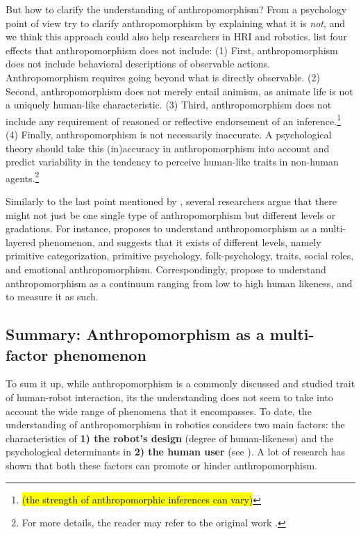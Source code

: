 \documentclass{frontiersSCNS} %
\begin{document}
But how to clarify the understanding of anthropomorphism?
From a psychology point of view \cite{epley_when_2008} try to clarify anthropomorphism by explaining what it is \textit{not}, and we think this approach could also help researchers in HRI and robotics. \cite{epley_when_2008} list four effects that anthropomorphism does not include:
(1) First, anthropomorphism does not include behavioral descriptions of observable actions. Anthropomorphism requires going beyond what is directly observable.
(2) Second, anthropomorphism does not merely entail animism, as animate life is not a uniquely human-like characteristic.
(3) Third, anthropomorphism does not include any requirement of reasoned or reflective endorsement of an inference.\footnote{\hl{(the strength of anthropomorphic inferences can vary)}}
(4) Finally, anthropomorphism is not necessarily inaccurate. A psychological theory should take this (in)accuracy in anthropomorphism into account and predict variability in the tendency to perceive human-like traits in non-human agents.\footnote{For more details, the reader may refer to the original work \citep{epley_when_2008}.}

Similarly to the last point mentioned by \cite{epley_when_2008}, several researchers argue that there might not just be one single type of anthropomorphism but different levels or gradations. For instance, \cite{persson_anthropomorphism_2000} proposes to understand anthropomorphism as a multi-layered phenomenon, and suggests that it exists of different levels, namely primitive categorization, primitive psychology, folk-psychology, traits, social roles, and emotional anthropomorphism. Correspondingly, \cite{ruijten_introducing_2014} propose to understand anthropomorphism as a continuum ranging from low to high human likeness, and to measure it as such. 
  

%
%
%
%
%
%



\subsection{Summary: Anthropomorphism as a multi-factor phenomenon}
\label{sec:multi-factors}

To sum it up, while anthropomorphism is a commonly discussed and
studied trait of human-robot interaction, its the understanding 
does not seem to take into account the wide range of phenomena that it
encompasses. To date, the understanding of anthropomorphism in robotics considers  two main factors: the
characteristics of \textbf{1) the robot's design} (degree of human-likeness) and
the psychological determinants in \textbf{2) the human user} (see
\cite{epley_seeing_2007}). A lot of research has shown that both these factors can
promote or hinder anthropomorphism.
\end{document}
